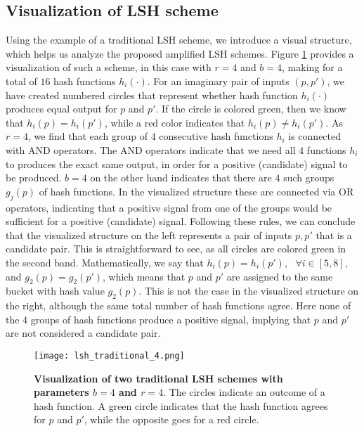 \subsection{Visualization of LSH scheme}
Using the example of a traditional LSH scheme, we introduce a visual structure, which helps us analyze the proposed amplified LSH schemes. Figure \ref{fig:lsh_traditional_visualization} provides a visualization of such a scheme, in this case with $r=4$ and $b=4$, making for a total of $16$ hash functions $h_i(\cdot)$. For an imaginary pair of inputs $(p, p')$, we have created numbered circles that represent whether hash function $h_i(\cdot)$ produces equal output for $p$ and $p'$. If the circle is colored green, then we know that $h_i(p) = h_i(p')$, while a red color indicates that $h_i(p) \neq h_i(p')$. As $r=4$, we find that each group of $4$ consecutive hash functions $h_i$ is connected with AND operators. The AND operators indicate that we need all $4$ functions $h_i$ to produces the exact same output, in order for a positive (candidate) signal to be produced. $b=4$ on the other hand indicates that there are $4$ such groups $g_j(p)$ of hash functions. In the visualized structure these are connected via OR operators, indicating that a positive signal from one of the groups would be sufficient for a positive (candidate) signal. Following these rules, we can conclude that the visualized structure on the left represents a pair of inputs $p, p'$ that is a candidate pair. This is straightforward to see, as all circles are colored green in the second band. Mathematically, we say that $h_i(p)=h_i(p'), \text{ } \forall i \in [5,8]$, and $g_2(p) = g_2(p')$, which means that $p$ and $p'$ are assigned to the same bucket with hash value $g_2(p)$. This is not the case in the visualized structure on the right, although the same total number of hash functions agree.  Here none of the $4$ groups of hash functions produce a positive signal, implying that $p$ and $p'$ are not considered a candidate pair.

\begin{figure}
    \texttt{[image: lsh\_traditional\_4.png]}
    \caption[Visualization of two traditional LSH schemes with parameters $b=4$ and $r=4$]{\textbf{Visualization of two traditional LSH schemes with parameters $b=4$ and $r=4$}. The circles indicate an outcome of a hash function. A green circle indicates that the hash function agrees for $p$ and $p'$, while the opposite goes for a red circle.}
    \label{fig:lsh_traditional_visualization}
\end{figure}

